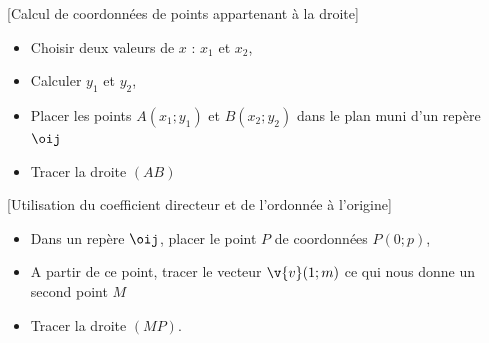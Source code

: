 \noindent \begin{minipage}{8cm}
\begin{methode}{}{}[Calcul de coordonnées de points appartenant à la droite]

\medskip
\begin{itemize}
\item Choisir deux valeurs de $x$ : $x_{1}$ et $x_{2}$,\medskip
\item Calculer $y_{1}$ et $y_{2}$,\medskip
\item Placer les points $A(x_1;y_1 )$ et $B(x_2;y_2)$ dans le plan muni d'un repère $\oij$ \medskip
\item Tracer la droite $(AB)$
\end{itemize}
\end{methode}
\end{minipage}
\hspace{5mm}
\noindent \begin{minipage}{8cm}
\begin{methode}{}{}[Utilisation du coefficient directeur et de l'ordonnée à l'origine]

\medskip
\begin{itemize}
\item Dans un repère $\oij$, placer le point $P$ de coordonnées $P(0;p)$,\medskip
\item A partir de ce point, tracer le vecteur $\v{v}(1;m)$ ce qui nous donne un second point $M$\medskip
\item Tracer la droite $(MP)$.
\end{itemize}
\end{methode}
\end{minipage}

